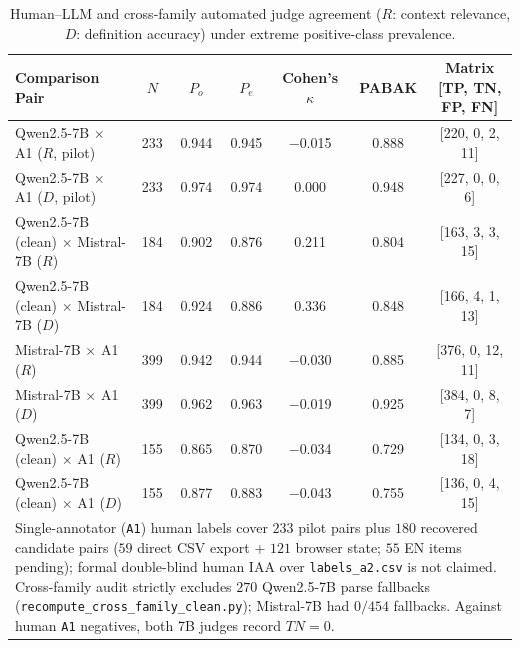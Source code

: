 \begin{table}[t]
\centering
\renewcommand{\arraystretch}{1.1}
\small
\begin{tabular}{@{}lcccccc@{}}
\toprule
\textbf{Comparison Pair} & \textbf{$N$} & \textbf{$P_o$} & \textbf{$P_e$} & \textbf{Cohen's $\kappa$} & \textbf{PABAK} & \textbf{Matrix [TP, TN, FP, FN]} \\
\midrule
Qwen2.5-7B $\times$ A1 ($R$, pilot) & 233 & 0.944 & 0.945 & $-$0.015 & 0.888 & [220, 0, 2, 11] \\
Qwen2.5-7B $\times$ A1 ($D$, pilot) & 233 & 0.974 & 0.974 & 0.000 & 0.948 & [227, 0, 0, 6] \\
Qwen2.5-7B (clean) $\times$ Mistral-7B ($R$) & 184 & 0.902 & 0.876 & 0.211 & 0.804 & [163, 3, 3, 15] \\
Qwen2.5-7B (clean) $\times$ Mistral-7B ($D$) & 184 & 0.924 & 0.886 & 0.336 & 0.848 & [166, 4, 1, 13] \\
Mistral-7B $\times$ A1 ($R$) & 399 & 0.942 & 0.944 & $-$0.030 & 0.885 & [376, 0, 12, 11] \\
Mistral-7B $\times$ A1 ($D$) & 399 & 0.962 & 0.963 & $-$0.019 & 0.925 & [384, 0, 8, 7] \\
Qwen2.5-7B (clean) $\times$ A1 ($R$) & 155 & 0.865 & 0.870 & $-$0.034 & 0.729 & [134, 0, 3, 18] \\
Qwen2.5-7B (clean) $\times$ A1 ($D$) & 155 & 0.877 & 0.883 & $-$0.043 & 0.755 & [136, 0, 4, 15] \\
\bottomrule
\multicolumn{7}{p{0.95\columnwidth}}{\footnotesize Single-annotator (\texttt{A1}) human labels cover $233$ pilot pairs plus $180$ recovered candidate pairs ($59$ direct CSV export + $121$ browser state; $55$ EN items pending); formal double-blind human IAA over \texttt{labels\_a2.csv} is not claimed. Cross-family audit strictly excludes $270$ Qwen2.5-7B parse fallbacks (\texttt{recompute\_cross\_family\_clean.py}); Mistral-7B had $0/454$ fallbacks. Against human \texttt{A1} negatives, both 7B judges record $TN=0$.}
\end{tabular}
\caption{Human--LLM and cross-family automated judge agreement ($R$: context relevance, $D$: definition accuracy) under extreme positive-class prevalence.}
\label{tab:llm_judge}
\end{table}
